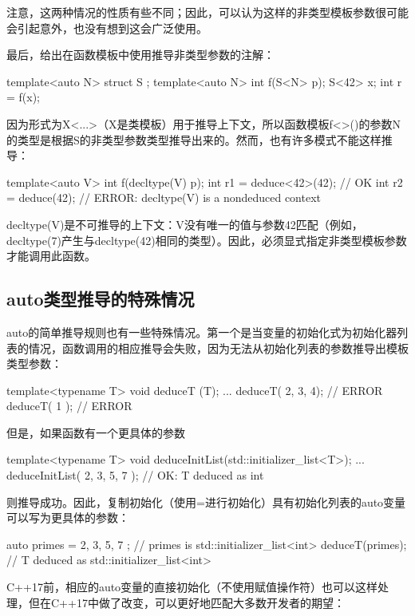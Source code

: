 注意，这两种情况的性质有些不同；因此，可以认为这样的非类型模板参数很可能会引起意外，也没有想到这会广泛使用。

最后，给出在函数模板中使用推导非类型参数的注解：

\begin{cpp}
template<auto N> struct S {};
template<auto N> int f(S<N> p);
S<42> x;
int r = f(x);
\end{cpp}

因为形式为X<...>（X是类模板）用于推导上下文，所以函数模板f<>()的参数N的类型是根据S的非类型参数类型推导出来的。然而，也有许多模式不能这样推导：

\begin{cpp}
template<auto V> int f(decltype(V) p);
int r1 = deduce<42>(42); // OK
int r2 = deduce(42); // ERROR: decltype(V) is a nondeduced context
\end{cpp}

decltype(V)是不可推导的上下文：V没有唯一的值与参数42匹配（例如，decltype(7)产生与decltype(42)相同的类型）。因此，必须显式指定非类型模板参数才能调用此函数。

\subsection{auto类型推导的特殊情况}

auto的简单推导规则也有一些特殊情况。第一个是当变量的初始化式为初始化器列表的情况，函数调用的相应推导会失败，因为无法从初始化列表的参数推导出模板类型参数：

\begin{cpp}
template<typename T>
void deduceT (T);
...
deduceT({ 2, 3, 4}); // ERROR
deduceT({ 1 }); // ERROR
\end{cpp}

但是，如果函数有一个更具体的参数

\begin{cpp}
template<typename T>
void deduceInitList(std::initializer_list<T>);
...
deduceInitList({ 2, 3, 5, 7 }); // OK: T deduced as int
\end{cpp}

则推导成功。因此，复制初始化（使用=进行初始化）具有初始化列表的auto变量可以写为更具体的参数：

\begin{cpp}
auto primes = { 2, 3, 5, 7 }; // primes is std::initializer_list<int>
deduceT(primes); // T deduced as std::initializer_list<int>
\end{cpp}

C++17前，相应的auto变量的直接初始化（不使用赋值操作符）也可以这样处理，但在C++17中做了改变，可以更好地匹配大多数开发者的期望：

